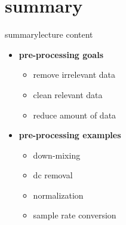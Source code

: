    \section{summary}
        \begin{frame}{summary}{lecture content}
            \begin{itemize}
                \item   \textbf{pre-processing goals}
                    \begin{itemize}
                        \item   remove irrelevant data
                        \item   clean relevant data
                        \item   reduce amount of data
                    \end{itemize}
                \item   \textbf{pre-processing examples}
                    \begin{itemize}
                        \item   down-mixing
                        \item   dc removal
                        \item   normalization
                        \item   sample rate conversion
                    \end{itemize}
            \end{itemize}
        \end{frame}

